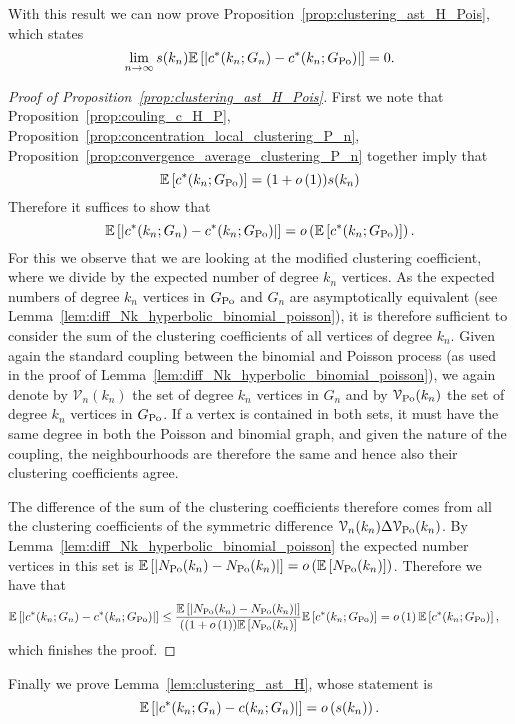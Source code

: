 With this result we can now prove Proposition~\ref{prop:clustering_ast_H_Pois}, which states
\[
	\lim_{n \to \infty} s(k_n)\mathbb{E}\left[\left|c^\ast(k_n; G_n) - c^\ast(k_n; G_{\text{Po}})\right|\right] = 0.
\]

\begin{proof}[Proof of Proposition~\ref{prop:clustering_ast_H_Pois}]
First we note that Proposition~\ref{prop:couling_c_H_P}, Proposition~\ref{prop:concentration_local_clustering_P_n}, Proposition~\ref{prop:convergence_average_clustering_P_n} together imply that
\[
	\mathbb{E}\left[c^\ast(k_n; G_{\text{Po}})\right] = (1+o\left(1\right))s(k_n)
\]
Therefore it suffices to show that
\[
	\mathbb{E}\left[\left|c^\ast(k_n; G_n) - c^\ast(k_n; G_{\text{Po}})\right|\right] = o\left(\mathbb{E}\left[c^\ast(k_n; G_{\text{Po}})\right]\right).
\]
For this we observe that we are looking at the modified clustering coefficient, where we divide by the expected number of degree $k_n$ vertices. As the expected numbers of degree $k_n$ vertices in $G_{\text{Po}}$ and $G_n$ are asymptotically equivalent (see Lemma~\ref{lem:diff_Nk_hyperbolic_binomial_poisson}), it is therefore sufficient to consider the sum of the clustering coefficients of all vertices of degree $k_n$.
Given again the standard coupling between the binomial and Poisson process (as used in the proof of Lemma~\ref{lem:diff_Nk_hyperbolic_binomial_poisson}), we again denote by $\mathcal{V}_n(k_n)$ the set of degree $k_n$ vertices in $G_n$ and by $\mathcal{V}_{{\mathrm{Po}}}(k_n)$ the set of degree $k_n$ vertices in $G_{\text{Po}}$. If a vertex is contained in both sets, it must have the same degree in both the Poisson and binomial graph, and given the nature of the coupling, the neighbourhoods are therefore the same and hence also their clustering coefficients agree.

The difference of the sum of the clustering coefficients therefore comes from all the clustering coefficients of the symmetric difference $\mathcal{V}_n(k_n) \Delta \mathcal{V}_{{\mathrm{Po}}}(k_n)$. By Lemma~\ref{lem:diff_Nk_hyperbolic_binomial_poisson} the expected number vertices in this set is $\mathbb{E}\left[\left|N_{{\mathrm{Po}}}(k_n) - N_{{\mathrm{Po}}}(k_n)\right|\right] = o\left(\mathbb{E}\left[N_{{\mathrm{Po}}}(k_n)\right]\right)$. Therefore we have that
\begin{align*}
	\mathbb{E}\left[\left|c^\ast(k_n; G_n) - c^\ast(k_n; G_{\text{Po}})\right|\right]
	&\le \frac{\mathbb{E}\left[\left|N_{{\mathrm{Po}}}(k_n)-N_{{\mathrm{Po}}}(k_n)\right|\right]}{((1+o\left(1\right))\mathbb{E}\left[N_{{\mathrm{Po}}}(k_n)\right]} \mathbb{E}\left[c^\ast(k_n; G_{\text{Po}})\right]
	= o\left(1\right)\mathbb{E}\left[c^\ast(k_n; G_{\text{Po}})\right],
\end{align*}
which finishes the proof.
\end{proof}

Finally we prove Lemma~\ref{lem:clustering_ast_H}, whose statement is
\[
	\mathbb{E}\left[\left|c^\ast(k_n; G_n) - c(k_n; G_n)\right|\right] = o\left(s(k_n)\right).
\]


